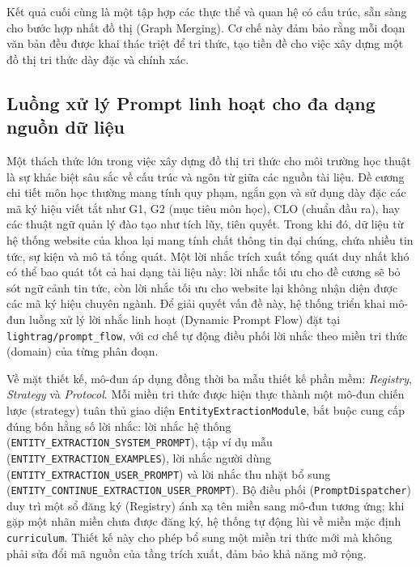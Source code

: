 \indent Kết quả cuối cùng là một tập hợp các thực thể và quan hệ có cấu trúc, sẵn sàng cho bước hợp nhất đồ thị (Graph Merging). Cơ chế này đảm bảo rằng mỗi đoạn văn bản đều được khai thác triệt để tri thức, tạo tiền đề cho việc xây dựng một đồ thị tri thức dày đặc và chính xác.

\subsection{Luồng xử lý Prompt linh hoạt cho đa dạng nguồn dữ liệu}

\indent Một thách thức lớn trong việc xây dựng đồ thị tri thức cho môi trường học thuật là sự khác biệt sâu sắc về cấu trúc và ngôn từ giữa các nguồn tài liệu. Đề cương chi tiết môn học thường mang tính quy phạm, ngắn gọn và sử dụng dày đặc các mã ký hiệu viết tắt như G1, G2 (mục tiêu môn học), CLO (chuẩn đầu ra), hay các thuật ngữ quản lý đào tạo như tích lũy, tiên quyết. Trong khi đó, dữ liệu từ hệ thống website của khoa lại mang tính chất thông tin đại chúng, chứa nhiều tin tức, sự kiện và mô tả tổng quát. Một lời nhắc trích xuất tổng quát duy nhất khó có thể bao quát tốt cả hai dạng tài liệu này: lời nhắc tối ưu cho đề cương sẽ bỏ sót ngữ cảnh tin tức, còn lời nhắc tối ưu cho website lại không nhận diện được các mã ký hiệu chuyên ngành. Để giải quyết vấn đề này, hệ thống triển khai mô-đun luồng xử lý lời nhắc linh hoạt (Dynamic Prompt Flow) đặt tại \texttt{lightrag/prompt\_flow}, với cơ chế tự động điều phối lời nhắc theo miền tri thức (domain) của từng phân đoạn.

\indent Về mặt thiết kế, mô-đun áp dụng đồng thời ba mẫu thiết kế phần mềm: \textit{Registry}, \textit{Strategy} và \textit{Protocol}. Mỗi miền tri thức được hiện thực thành một mô-đun chiến lược (strategy) tuân thủ giao diện \texttt{EntityExtractionModule}, bắt buộc cung cấp đúng bốn hằng số lời nhắc: lời nhắc hệ thống (\texttt{ENTITY\_\allowbreak EXTRACTION\_\allowbreak SYSTEM\_\allowbreak PROMPT}), tập ví dụ mẫu (\texttt{ENTITY\_\allowbreak EXTRACTION\_\allowbreak EXAMPLES}), lời nhắc người dùng (\texttt{ENTITY\_\allowbreak EXTRACTION\_\allowbreak USER\_\allowbreak PROMPT}) và lời nhắc thu nhặt bổ sung (\texttt{ENTITY\_\allowbreak CONTINUE\_\allowbreak EXTRACTION\_\allowbreak USER\_\allowbreak PROMPT}). Bộ điều phối (\texttt{PromptDispatcher}) duy trì một sổ đăng ký (Registry) ánh xạ tên miền sang mô-đun tương ứng; khi gặp một nhãn miền chưa được đăng ký, hệ thống tự động lùi về miền mặc định \texttt{curriculum}. Thiết kế này cho phép bổ sung một miền tri thức mới mà không phải sửa đổi mã nguồn của tầng trích xuất, đảm bảo khả năng mở rộng.

